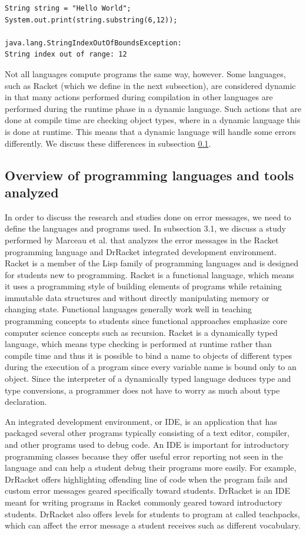 \documentclass{sig-alternate}
\begin{document}
\begin{verbatim}
String string = "Hello World";
System.out.print(string.substring(6,12));

java.lang.StringIndexOutOfBoundsException:
String index out of range: 12
\end{verbatim}

Not all languages compute programs the same way, however.
Some languages, such as Racket (which we define in the next subsection), are considered dynamic in that many actions performed during compilation in other languages are performed during the runtime phase in a dynamic language.
Such actions that are done at compile time are checking object types, where in a dynamic language this is done at runtime.
This means that a dynamic language will handle some errors differently.
We discuss these differences in subsection \ref{subsec:languages}.


\subsection{Overview of programming languages and tools analyzed}\label{subsec:languages}

In order to discuss the research and studies done on error messages, we need to define the languages and programs used.
In subsection 3.1, we discuss a study performed by Marceau et al. that analyzes the error messages in the Racket programming language and DrRacket integrated development environment.
Racket is a member of the Lisp family of programming languages and is designed for students new to programming.
Racket is a functional language, which means it uses a programming style of building elements of programs while retaining immutable data structures 
and without directly manipulating memory or changing state.
Functional languages generally work well in teaching programming concepts to students since functional approaches emphasize core computer science concepts such as recursion.
Racket is a dynamically typed language, which means type checking is performed at runtime rather than compile time and thus it is possible to bind a name to objects of different types during the execution of a program since every variable name is bound only to an object.
Since the interpreter of a dynamically typed language deduces type and type conversions, a programmer does not have to worry as much about type declaration.

An integrated development environment, or IDE, is an application that has packaged several other programs typically consisting of a text editor, compiler, and other programs used to debug code.
An IDE is important for introductory programming classes because they offer useful error reporting not seen in the language and can help a student debug their programs more easily.
For example, DrRacket offers highlighting offending line of code when the program fails and custom error messages geared specifically toward students.
DrRacket is an IDE meant for writing programs in Racket commonly geared toward introductory students.
DrRacket also offers levels for students to program at called teachpacks, which can affect the error message a student receives such as different vocabulary.
\end{document}
